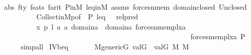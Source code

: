 \begin{isabellebody}
\ \ \ \ \isamarkupfalse%
\ abs{}\ fty\ fsats{}\ farit\ P{\isacharunderscore}{\kern0pt}in{\isacharunderscore}{\kern0pt}M\ leq{\isacharunderscore}{\kern0pt}in{\isacharunderscore}{\kern0pt}M\ assms\ forces{\isacharunderscore}{\kern0pt}nmem\ domain{\isacharunderscore}{\kern0pt}closed\ Un{\isacharunderscore}{\kern0pt}closed\isanewline
\ \ \ \ \ \ \ \ \ \ Collect{\isacharunderscore}{\kern0pt}in{\isacharunderscore}{\kern0pt}M{\isacharunderscore}{\kern0pt}{}p{\isacharbrackleft}{\kern0pt}of\ {\isacharquery}{\kern0pt}{\isasymphi}\ P\ leq\ {\isasymtheta}\ {\isasymtau}\ {\isacharquery}{\kern0pt}rel{\isacharunderscore}{\kern0pt}pred\ \isanewline
\ \ \ \ \ \ \ \ \ \ {\isachardoublequoteopen}{\isasymlambda}x\ p\ l\ a{}\ a{}{\isachardot}{\kern0pt}\ {\isacharparenleft}{\kern0pt}{\isasymexists}{\isasymsigma}{\isasymin}domain{\isacharparenleft}{\kern0pt}a{}{\isacharparenright}{\kern0pt}\ {\isasymunion}\ domain{\isacharparenleft}{\kern0pt}a{}{\isacharparenright}{\kern0pt}{\isachardot}{\kern0pt}\ forces{\isacharunderscore}{\kern0pt}nmem{\isacharprime}{\kern0pt}{\isacharparenleft}{\kern0pt}p{\isacharcomma}{\kern0pt}l{\isacharcomma}{\kern0pt}x{\isacharcomma}{\kern0pt}{\isasymsigma}{\isacharcomma}{\kern0pt}a{}{\isacharparenright}{\kern0pt}\ {\isasymand}\ \isanewline
\ \ \ \ \ \ \ \ \ \ \ \ \ \ \ \ \ \ \ \ \ \ \ \ \ \ \ \ \ \ \ \ \ \ \ \ \ \ \ \ \ \ \ \ \ \ \ \ \ \ \ \ \ forces{\isacharunderscore}{\kern0pt}mem{\isacharprime}{\kern0pt}{\isacharparenleft}{\kern0pt}p{\isacharcomma}{\kern0pt}l{\isacharcomma}{\kern0pt}x{\isacharcomma}{\kern0pt}{\isasymsigma}{\isacharcomma}{\kern0pt}a{}{\isacharparenright}{\kern0pt}{\isacharparenright}{\kern0pt}{\isachardoublequoteclose}\ P{\isacharbrackright}{\kern0pt}\ \ \isanewline
\ \ \ \ \isamarkupfalse%
\ simp{\isacharunderscore}{\kern0pt}all\isanewline
{}\isamarkupfalse%
%
\endisatagproof
{\isafoldproof}%
%
\isadelimproof
\isanewline
%
\endisadelimproof
\isanewline
\isanewline
{}\isamarkupfalse%
\ IV{}{}{}b{\isacharunderscore}{\kern0pt}eq{\isacharcolon}{\kern0pt}\isanewline
\ \ \isanewline
\ \ \ \ {\isachardoublequoteopen}M{\isacharunderscore}{\kern0pt}generic{\isacharparenleft}{\kern0pt}G{\isacharparenright}{\kern0pt}{\isachardoublequoteclose}\ {\isachardoublequoteopen}val{\isacharparenleft}{\kern0pt}G{\isacharcomma}{\kern0pt}{\isasymtau}{\isacharparenright}{\kern0pt}\ {\isacharequal}{\kern0pt}\ val{\isacharparenleft}{\kern0pt}G{\isacharcomma}{\kern0pt}{\isasymtheta}{\isacharparenright}{\kern0pt}{\isachardoublequoteclose}\ {\isachardoublequoteopen}{\isasymtau}{\isasymin}M{\isachardoublequoteclose}\ {\isachardoublequoteopen}{\isasymtheta}{\isasymin}M{\isachardoublequoteclose}\ \isanewline

\end{isabellebody}
